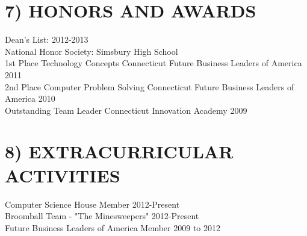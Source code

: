 \documentclass{res}
\begin{document}
\begin{resume}
\section{7) HONORS AND AWARDS}          
    \vspace{2pt}
    Dean's List: 2012-2013  \\        
    National Honor Society: Simsbury High School  \\        
    1st Place Technology Concepts Connecticut Future Business Leaders of America  2011\\        
    2nd Place Computer Problem Solving Connecticut Future Business Leaders of America 2010\\
    Outstanding Team Leader Connecticut Innovation Academy 2009
    \vspace{-5pt}
 
\section{8) EXTRACURRICULAR ACTIVITIES}        
    \vspace{2pt}
    Computer Science House Member 2012-Present \\  
    Broomball Team - "The Minesweepers" 2012-Present\\     
    Future Business Leaders of America Member 2009 to 2012   
 
\end{resume}
\end{document}
